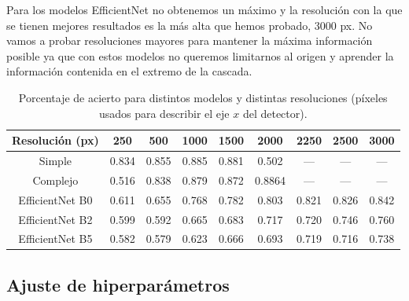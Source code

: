 \documentclass[a4paper,12pt,twoside,titlepage]{article}
\begin{document}
Para los modelos EfficientNet no obtenemos un máximo y la resolución con la que se tienen mejores resultados es la más alta que hemos probado, 3000 px. No vamos a probar resoluciones mayores para mantener la máxima información posible ya que con estos modelos no queremos limitarnos al origen y aprender la información contenida en el extremo de la cascada.

\begin{table}[h!]
  \centering
  \begin{tabular}{|c|c|c|c|c|c|c|c|c|}
  \hline
  Resolución (px) & 250   & 500   & 1000  & 1500  & 2000  & 2250   & 2500   & 3000    \\ \hline\hline %
  Simple          & 0.834 & 0.855 & 0.885 & 0.881 & 0.502 & ---    & ---    & ---     \\ \hline       %
  Complejo        & 0.516 & 0.838 & 0.879 & 0.872 & 0.8864 & ---    & ---    & ---     \\ \hline       %
  EfficientNet B0 & 0.611 & 0.655 & 0.768 & 0.782 & 0.803 & 0.821  & 0.826  & 0.842   \\ \hline       %
  EfficientNet B2 & 0.599 & 0.592 & 0.665 & 0.683 & 0.717 & 0.720  & 0.746  & 0.760   \\ \hline       %
  EfficientNet B5 & 0.582 & 0.579 & 0.623 & 0.666 & 0.693 & 0.719  & 0.716  & 0.738   \\ \hline       %
  \end{tabular}
  \caption{Porcentaje de acierto para distintos modelos y distintas resoluciones (píxeles usados para describir el eje $x$ del detector).}
  \label{tab:estudio_res}
\end{table}


\subsection{Ajuste de hiperparámetros}
\end{document}
